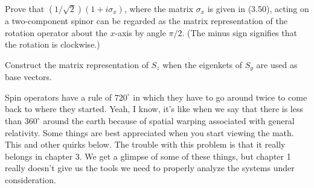 \begin{question}

  \begin{questionpart}
    Prove that $(1/\sqrt{2})(1+i\sigma_x)$, where the matrix $\sigma_x$
    is given in (3.50), acting on a two-component spinor can be
    regarded as the matrix representation of the rotation operator
    about the $x$-axis by angle $\pi/2$. (The minus sign signifies
    that the rotation is clockwise.)
  \end{questionpart}

  \begin{questionpart}
    Construct the matrix representation of $S_z$ when the eigenkets of
    $S_y$ are used as base vectors.
  \end{questionpart}

\end{question}

\begin{purpose}
  Spin operators have a rule of $720^{\circ}$ in which they have to
  go around twice to come back to where they started.  Yeah, I know,
  it's like when we say that there is less than $360^{\circ}$ around
  the earth because of spatial warping associated with general
  relativity.  Some things are best appreciated when you start viewing
  the math.  This and other quirks below.  The trouble with this
  problem is that it really belongs in chapter 3.  We get a glimpse of
  some of these things, but chapter 1 really doesn't give us the tools
  we need to properly analyze the systems under consideration.
\end{purpose}

